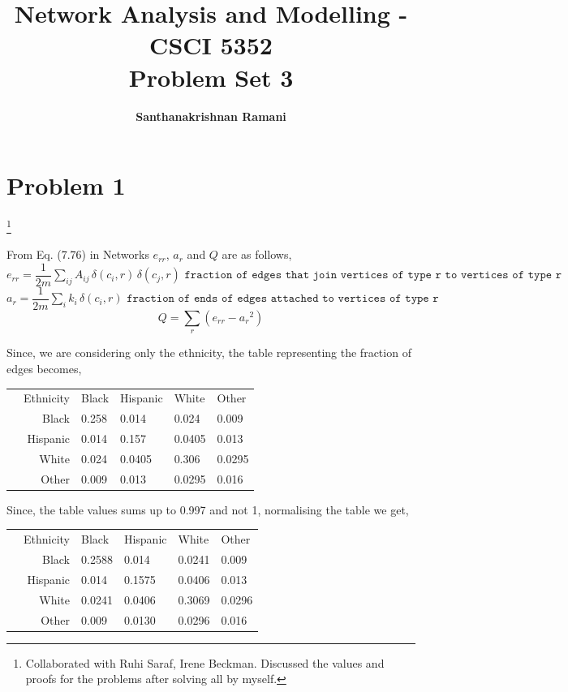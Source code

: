 \documentclass{article}
\date{\displaydate{date}}
\title{\textbf{Network Analysis and Modelling - CSCI 5352} \\
Problem Set 3}
\author{\textbf{Santhanakrishnan Ramani}}
\newcommand\blfootnote[1]{%
  \begingroup
  \renewcommand\thefootnote{}\footnote{#1}%
  \addtocounter{footnote}{-1}%
  \endgroup
}
\begin{document}
\maketitle

\section*{Problem 1}
\blfootnote{Collaborated with Ruhi Saraf, Irene Beckman. Discussed the values and proofs for the problems after solving all by myself.}
From Eq. (7.76) in Networks $e_{rr}$, $a_{r}$ and $Q$ are as follows,\\
$e_{rr} = \dfrac{1}{2m}\sum_{ij} A_{ij}\,\delta(c_i,r)\,\delta(c_j,r)  \texttt{ fraction of edges that join vertices of type r to vertices of type r}$\\
$a_{r} = \dfrac{1}{2m}\sum_{i} k_i\,\delta(c_i,r) \texttt{ fraction of ends of edges attached to vertices of type r}$\\
$$Q = \sum_{r} (e_{rr} - {a_r}^2)$$

Since, we are considering only the ethnicity, the table representing the fraction of edges becomes,
\begin{center}
\begin{tabular}{l r|l l l l}                      
& \multicolumn{1}{r|}{Ethnicity} &Black   &Hispanic   &White   &Other   \\ \cline{2-6}
& \multicolumn{1}{r|}{Black} &0.258   &0.014   &0.024   &0.009   \\
& \multicolumn{1}{r|}{Hispanic} &0.014   &0.157   &0.0405   &0.013   \\ 
& \multicolumn{1}{r|}{White} &0.024   &0.0405   &0.306   &0.0295   \\
& \multicolumn{1}{r|}{Other} &0.009   &0.013   &0.0295   &0.016   
\end{tabular}  
\end{center}

Since, the table values sums up to 0.997 and not 1, normalising the table we get,
\begin{center}
\begin{tabular}{l r|l l l l}                      
& \multicolumn{1}{r|}{Ethnicity} &Black   &Hispanic   &White   &Other   \\ \cline{2-6}
& \multicolumn{1}{r|}{Black} &0.2588   &0.014   &0.0241   &0.009   \\
& \multicolumn{1}{r|}{Hispanic} &0.014   &0.1575   &0.0406   &0.013   \\ 
& \multicolumn{1}{r|}{White} &0.0241   &0.0406   &0.3069   &0.0296   \\
& \multicolumn{1}{r|}{Other} &0.009   &0.0130   &0.0296   &0.016   
\end{tabular}  
\end{center}
\end{document}

